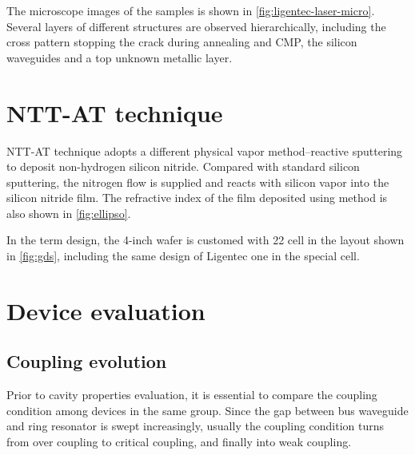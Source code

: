 The microscope images of the samples is shown in \autoref{fig:ligentec-laser-micro}. Several layers of different structures are observed hierarchically, including the cross pattern stopping the crack during annealing and CMP, the silicon waveguides and a top unknown metallic layer.

\begin{figure}
	\centering
	
	\label{fig:gds}
\end{figure}

\begin{figure}
	\centering
	
	\label{fig:ligentec-laser-micro}
\end{figure}

\section{NTT-AT technique}


NTT-AT technique adopts a different physical vapor method--reactive sputtering to deposit non-hydrogen silicon nitride. Compared with standard silicon sputtering, the nitrogen flow is supplied and reacts with silicon vapor into the silicon nitride film. The refractive index of the film deposited using method is also shown in \autoref{fig:ellipso}.

In the term design, the 4-inch wafer is customed with 22 cell in the layout shown in \autoref{fig:gds}, including the same design of Ligentec one in the special cell.



\section{Device evaluation}

\subsection{Coupling evolution}

Prior to cavity properties evaluation, it is essential to compare the coupling condition among devices in the same group. Since the gap between bus waveguide and ring resonator is swept increasingly, usually the coupling condition turns from over coupling to critical coupling, and finally into weak coupling.

